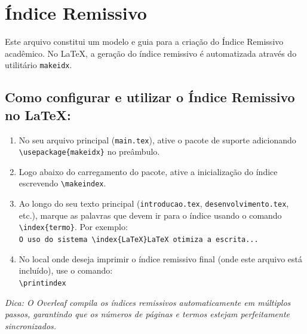 
\chapter*{Índice Remissivo}

Este arquivo constitui um modelo e guia para a criação do Índice Remissivo acadêmico. No LaTeX, a geração do índice remissivo é automatizada através do utilitário \texttt{makeidx}.

\section*{Como configurar e utilizar o Índice Remissivo no LaTeX:}

\begin{enumerate}
  \item No seu arquivo principal (\texttt{main.tex}), ative o pacote de suporte adicionando \texttt{\textbackslash usepackage\{makeidx\}} no preâmbulo.
  \item Logo abaixo do carregamento do pacote, ative a inicialização do índice escrevendo \texttt{\textbackslash makeindex}.
  \item Ao longo do seu texto principal (\texttt{introducao.tex}, \texttt{desenvolvimento.tex}, etc.), marque as palavras que devem ir para o índice usando o comando \texttt{\textbackslash index\{termo\}}. Por exemplo: \\
        \texttt{O uso do sistema \textbackslash index\{LaTeX\}LaTeX otimiza a escrita...}
  \item No local onde deseja imprimir o índice remissivo final (onde este arquivo está incluído), use o comando: \\
        \texttt{\textbackslash printindex}
\end{enumerate}

\vspace{1cm}
\begin{center}
  \small
  \textit{Dica: O Overleaf compila os índices remissivos automaticamente em múltiplos passos, garantindo que os números de páginas e termos estejam perfeitamente sincronizados.}
\end{center}
